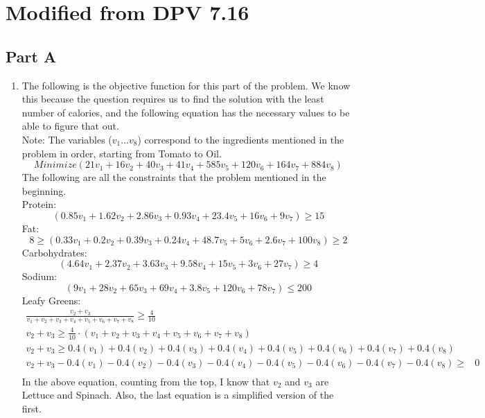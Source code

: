 \documentclass[11pt,letterpaper]{article}
\begin{document}
\section{Modified from DPV 7.16}
\subsection*{Part A}
\begin{enumerate}
	\item The following is the objective function for this part of the problem. We know this because the question requires us to find the solution with the least number of calories, and the following equation has the necessary values to be able to figure that out. \\
	Note: The variables ($v_1 ... v_8$) correspond to the ingredients mentioned in the problem in order, starting from Tomato to Oil.
	\begin{equation*}
	Minimize (21v_1 + 16v_2 + 40v_3 + 41v_4 + 585v_5 + 120v_6 + 164v_7 + 884v_8)
	\end{equation*}
	The following are all the constraints that the problem mentioned in the beginning.\\
	Protein:
	\begin{equation*}
	(0.85v_1+1.62v_2+2.86v_3+0.93v_4+23.4v_5+16v_6+9v_7) \geq 15
	\end{equation*}
	Fat:
	\begin{equation*}
	8 \geq (0.33v_1+0.2v_2+0.39v_3+0.24v_4+48.7v_5+5v_6+2.6v_7+100v_8) \geq 2
	\end{equation*}
	Carbohydrates:
	\begin{equation*}
	(4.64v_1+2.37v_2+3.63v_3+9.58v_4+15v_5+3v_6+27v_7) \geq 4
	\end{equation*}
	Sodium:
	\begin{equation*}
	(9v_1+28v_2+65v_3+69v_4+3.8v_5+120v_6+78v_7) \leq 200
	\end{equation*}
	Leafy Greens:
	\begin{align*}
	\frac{v_2 + v_3}{v_1 + v_2 + v_3 + v_4 + v_5 + v_6 + v_7 + v_8} \geq \frac{4}{10} \\
	v_2 + v_3 \geq \frac{4}{10} \cdot \left( v_1 + v_2 + v_3 + v_4 + v_5 + v_6 + v_7 + v_8\right) \\
	v_2 + v_3 \geq 0.4(v_1) + 0.4(v_2) + 0.4(v_3) + 0.4(v_4) + 0.4(v_5) + 0.4(v_6) + 0.4(v_7) + 0.4(v_8) \\
	v_2 + v_3 - 0.4(v_1) - 0.4(v_2) - 0.4(v_3) - 0.4(v_4) - 0.4(v_5) - 0.4(v_6) - 0.4(v_7) - 0.4(v_8) \geq &0 \\
	\end{align*}
	In the above equation, counting from the top, I know that $v_2$ and $v_3$ are Lettuce and Spinach. Also, the last equation is a simplified version of the first.
	

\end{enumerate}
\end{document}
